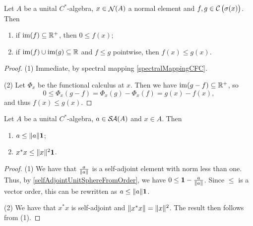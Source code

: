 \begin{lemma}
Let $A$ be a unital $C^*$-algebra, $x\in \mathop{\mathcal{N}}\nolimits(A)$ a normal element and $f,g\in \operatorname{\mathcal{C}}\big(\sigma(x)\big)$. Then
\begin{enumerate}
\item if $\operatorname{im}(f)\subseteq \mathbb{R}^+$, then $0\leq f(x)$;
\item if $\operatorname{im}(f)\cup\operatorname{im}(g) \subseteq \mathbb{R}$ and $f\leq g$ pointwise, then $f(x) \leq g(x)$.
\end{enumerate}
\end{lemma}
\begin{proof}
(1) Immediate, by spectral mapping \ref{spectralMappingCFC}.

(2) Let $\Phi_x$ be the functional calculus at $x$. Then we have $\operatorname{im}(g-f) \subseteq \mathbb{R}^+$, so
\[ 0 \leq \Phi_x(g-f) = \Phi_x(g)- \Phi_x(f) = g(x) - f(x), \]
and thus $f(x)\leq g(x)$.
\end{proof}

\begin{lemma} \label{normInequalityFromSAInequality}
Let $A$ be a unital $C^*$-algebra, $a\in \mathop{\mathcal{S}\hspace{-0.15em}\mathcal{A}}\nolimits(A)$ and $x\in A$. Then
\begin{enumerate}
\item $a\leq \lVert a\rVert\boldsymbol{\mathrm{1}}$;
\item $x^*x \leq \lVert x\rVert^2 \boldsymbol{\mathrm{1}}$. 
\end{enumerate}
\end{lemma}
\begin{proof}
(1) We have that $\frac{a}{\lVert a\rVert}$ is a self-adjoint element with norm less than one. Thus, by \ref{selfAdjointUnitSphereFromOrder}, we have $0\leq \boldsymbol{\mathrm{1}} - \frac{a}{\lVert a\rVert}$. Since $\leq$ is a vector order, this can be rewritten as $a\leq \lVert a\rVert\boldsymbol{\mathrm{1}}$.

(2) We have that $x^*x$ is self-adjoint and $\lVert x^*x\rVert = \lVert x\rVert^2$. The result then follows from (1).
\end{proof}

